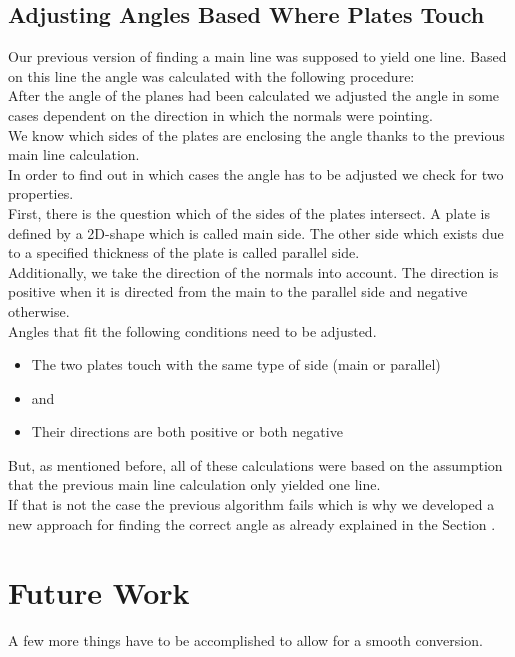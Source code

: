 \documentclass[../ClassicThesis.tex]{subfiles}
\begin{document}
\subsection{Adjusting Angles Based Where Plates Touch}
Our previous version of finding a main line was supposed to yield one line. Based on this line the angle was calculated with the following procedure:\\ 
After the angle of the planes had been calculated we adjusted the angle in some cases dependent on the direction in which the normals were pointing. \\
We know which sides of the plates are enclosing the angle thanks to the previous main line calculation.\\
In order to find out in which cases the angle has to be adjusted we check for two properties.\\
First, there is the question which of the sides of the plates intersect. A plate is defined by a 2D-shape which is called main side. The other side which exists due to a specified thickness of the plate is called parallel side.\\
Additionally, we take the direction of the normals into account. The direction is positive when it is directed from the main to the parallel side and negative otherwise.\\
Angles that fit the following conditions need to be adjusted.
\begin{itemize}
    \item The two plates touch with the same type of side (main or parallel)
    \item[] and
    \item Their directions are both positive or both negative
\end{itemize}
But, as mentioned before, all of these calculations were based on the assumption that the previous main line calculation only yielded one line.\\
If that is not the case the previous algorithm fails which is why we developed a new approach for finding the correct angle as already explained in the Section .

\section{Future Work}
A few more things have to be accomplished to allow for a smooth conversion. 
\end{document}
